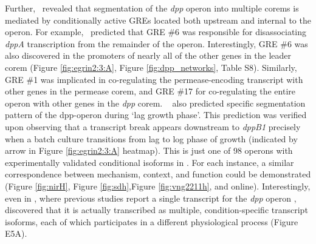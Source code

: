 Further, \egrine~revealed that segmentation of the \textit{dpp} operon into multiple corems is mediated by conditionally active GREs located both upstream and internal to the operon. For example, \egrine~predicted that GRE \#6 was responsible for disassociating \textit{dppA} transcription from the remainder of the operon. Interestingly, GRE \#6 was also discovered in the promoters of nearly all of the other genes in the leader corem (Figure \ref{fig:egrin2:3:A}, Figure \ref{fig:dpp_networks}, Table S8). Similarly, GRE \#1 was implicated in co-regulating the permease-encoding transcript with other genes in the permease corem, and GRE \#17 for co-regulating the entire operon with other genes in the \textit{dpp} corem. \egrine~ also predicted specific segmentation pattern of the dpp-operon during ‘lag growth phase’. This prediction was verified upon observing that a transcript break appears downstream to \textit{dppB1} precisely when a batch culture transitions from lag to log phase of growth (indicated by arrow in Figure \ref{fig:egrin2:3:A} heatmap). This is just one of 98 operons with experimentally validated conditional isoforms in \halo. For each instance, a similar correspondence between mechanism, context, and function could be demonstrated (Figure \ref{fig:nirH}, Figure \ref{fig:sdh},Figure \ref{fig:vng2211h}, and online).   Interestingly, even in \eco, where previous studies report a single transcript for the \textit{dpp} operon \cite{abouhamad_dipeptide_1994}, \egrine~ discovered that it is actually transcribed as multiple, condition-specific transcript isoforms, each of which participates in a different physiological process (Figure E5A).

